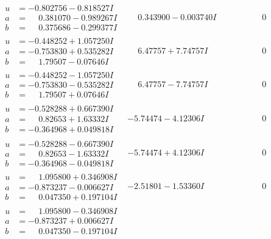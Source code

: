 \documentclass[1p]{elsarticle_modified}
\theoremstyle{definition}
\begin{document}
$$\begin{array}{c|c|c}
\begin{aligned}
u &= -0.802756 - 0.818527 I \\
a &= \phantom{-}0.381070 - 0.989267 I \\
b &= \phantom{-}0.375686 - 0.299377 I\end{aligned}
 & \phantom{-}0.343900 - 0.003740 I & \phantom{-0.000000 } 0 \\ \hline\begin{aligned}
u &= -0.448252 + 1.057250 I \\
a &= -0.753830 + 0.535282 I \\
b &= \phantom{-}1.79507 - 0.07646 I\end{aligned}
 & \phantom{-}6.47757 + 7.74757 I & \phantom{-0.000000 } 0 \\ \hline\begin{aligned}
u &= -0.448252 - 1.057250 I \\
a &= -0.753830 - 0.535282 I \\
b &= \phantom{-}1.79507 + 0.07646 I\end{aligned}
 & \phantom{-}6.47757 - 7.74757 I & \phantom{-0.000000 } 0 \\ \hline\begin{aligned}
u &= -0.528288 + 0.667390 I \\
a &= \phantom{-}0.82653 + 1.63332 I \\
b &= -0.364968 + 0.049818 I\end{aligned}
 & -5.74474 - 4.12306 I & \phantom{-0.000000 } 0 \\ \hline\begin{aligned}
u &= -0.528288 - 0.667390 I \\
a &= \phantom{-}0.82653 - 1.63332 I \\
b &= -0.364968 - 0.049818 I\end{aligned}
 & -5.74474 + 4.12306 I & \phantom{-0.000000 } 0 \\ \hline\begin{aligned}
u &= \phantom{-}1.095800 + 0.346908 I \\
a &= -0.873237 - 0.006627 I \\
b &= \phantom{-}0.047350 + 0.197104 I\end{aligned}
 & -2.51801 - 1.53360 I & \phantom{-0.000000 } 0 \\ \hline\begin{aligned}
u &= \phantom{-}1.095800 - 0.346908 I \\
a &= -0.873237 + 0.006627 I \\
b &= \phantom{-}0.047350 - 0.197104 I\end{aligned}

\end{array}$$
\end{document}
